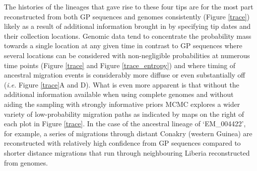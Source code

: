\documentclass{bmcart}
\begin{document}
The histories of the lineages that gave rise to these four tips are for the most part reconstructed from both GP sequences and genomes consistently (Figure \ref{trace}) likely as a result of additional information brought in by specifying tip dates and their collection locations.
Genomic data tend to concentrate the probability mass towards a single location at any given time in contrast to GP sequences where several locations can be considered with non-negligible probabilities at numerous time points (Figure \ref{trace} and Figure \ref{trace_entropy}) and where timing of ancestral migration events is considerably more diffuse or even substantially off (\textit{i.e.} Figure \ref{trace}A and D).
What is even more apparent is that without the additional information available when using complete genomes and without aiding the sampling with strongly informative priors MCMC explores a wider variety of low-probability migration paths as indicated by maps on the right of each plot in Figure \ref{trace}.
In the case of the ancestral lineage of `EM\_004422', for example, a series of migrations through distant Conakry (western Guinea) are reconstructed with relatively high confidence from GP sequences compared to shorter distance migrations that run through neighbouring Liberia reconstructed from genomes.
\end{document}
